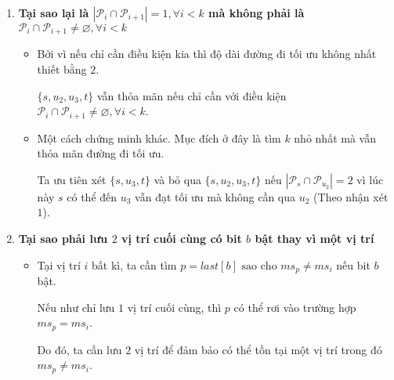 \documentclass[12pt,a4paper]{article}
\begin{document}
	\begin{enumerate}
		\item \textbf{Tại sao lại là $|\mathcal{P}_i \cap \mathcal{P}_{i+1}| = 1, \forall i < k$ mà không phải là $\mathcal{P}_i \cap \mathcal{P}_{i+1} \not = \varnothing, \forall i < k$}
		\begin{itemize}
			\item Bởi vì nếu chỉ cần điều kiện kia thì độ dài đường đi tối ưu không nhất thiết bằng $2$. 
			
			$\{s, u_2, u_3, t\}$ vẫn thỏa mãn nếu chỉ cần với điều kiện $\mathcal{P}_i \cap \mathcal{P}_{i+1} \not = \varnothing, \forall i < k$.
			
			\item Một cách chứng minh khác. Mục đích ở đây là tìm $k$ nhỏ nhất mà vẫn thỏa mãn đường đi tối ưu. 
			
			Ta ưu tiên xét $\{s, u_3, t\}$ và bỏ qua $\{s, u_2, u_3, t\}$ nếu $|\mathcal{P}_s \cap \mathcal{P}_{u_2}| = 2$ vì lúc này $s$ có thể đến $u_3$ vẫn đạt tối ưu mà không cần qua $u_2$ (Theo nhận xét $1$).
		\end{itemize}
		\item \textbf{Tại sao phải lưu $2$ vị trí cuối cùng có bit $b$ bật thay vì một vị trí}
		
		\begin{itemize}
			\item Tại vị trí $i$ bất kì, ta cần tìm $p = last[b] \text{ sao cho } ms_p \ne ms_i$ nếu bit $b$ bật.
			
			Nếu như chỉ lưu $1$ vị trí cuối cùng, thì $p$ có thể rơi vào trường hợp $ms_p = ms_i$.
			
			Do đó, ta cần lưu $2$ vị trí để đảm bảo có thể tồn tại một vị trí trong đó $ms_p \ne ms_i$.
		\end{itemize}
	\end{enumerate}
\end{document}
